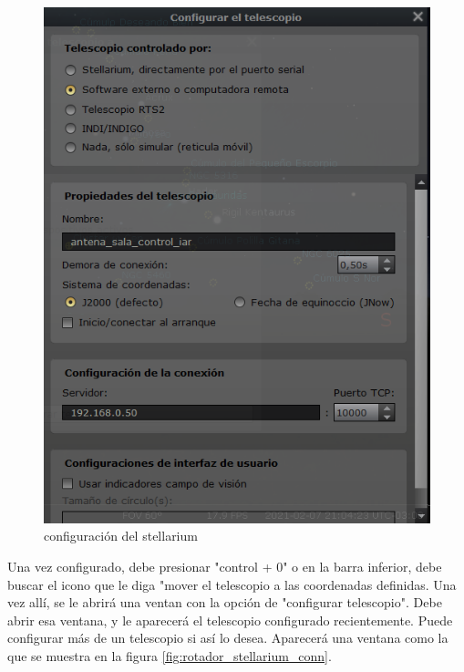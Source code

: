 \begin{figure}[ht]
	\centering 
	\includegraphics[scale=0.5]{configuracion_telescopio}
	\caption{configuración del stellarium} 
	\label{fig:conf_net_stell}
\end{figure}  

Una vez configurado, debe presionar "control + 0" o en la barra inferior, debe buscar el icono que le diga "mover el telescopio a las coordenadas definidas. Una vez allí, se le abrirá una ventan con la opción de "configurar telescopio". Debe abrir esa ventana, y le aparecerá el telescopio configurado recientemente. Puede configurar más de un telescopio si así lo desea. Aparecerá una ventana como la que se muestra en la figura \ref{fig:rotador_stellarium_conn}. 
 

